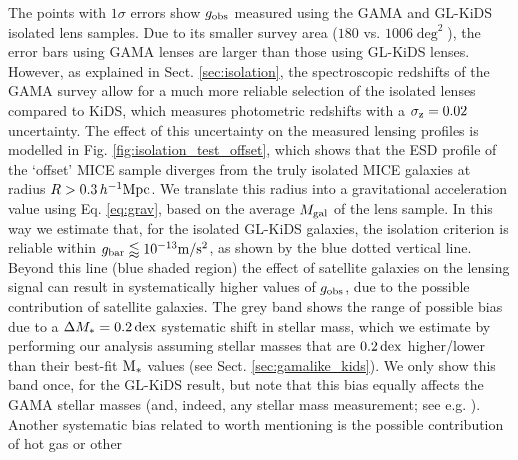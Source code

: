 \documentclass[usenatbib]{mnras}
\newcommand{\hMpc}{\, h^{-1}{\rm{Mpc}} }
\newcommand{\mpss}{ {\rm m/s^2} }
\newcommand{\un}[1]{_{\rm #1}}
\newcommand{\dex}{\, {\rm dex}}
\begin{document}
The points with $1\sigma$ errors show $g\un{obs}$ measured using the GAMA and GL-KiDS isolated lens samples. Due to its smaller survey area ($180$ vs. $1006 \deg^2$), the error bars using GAMA lenses are larger than those using GL-KiDS lenses. However, as explained in Sect. \ref{sec:isolation}, the spectroscopic redshifts of the GAMA survey allow for a much more reliable selection of the isolated lenses compared to KiDS, which measures photometric redshifts with a $\sigma\un{z}=0.02$ uncertainty. The effect of this uncertainty on the measured lensing profiles is modelled in Fig. \ref{fig:isolation_test_offset}, which shows that the ESD profile of the `offset' MICE sample diverges from the truly isolated MICE galaxies at radius $R > 0.3 \hMpc$. We translate this radius into a gravitational acceleration value using Eq. \ref{eq:grav}, based on the average $M\un{gal}$ of the lens sample. In this way we estimate that, for the isolated GL-KiDS galaxies, the isolation criterion is reliable within $g\un{bar} \lessapprox 10^{-13} \mpss$, as shown by the blue dotted vertical line. Beyond this line (blue shaded region) the effect of satellite galaxies on the lensing signal can result in systematically higher values of $g\un{obs}$, due to the possible contribution of satellite galaxies. The grey band shows the range of possible bias due to a $\Delta M_*=0.2 \dex$ systematic shift in stellar mass, which we estimate by performing our analysis assuming stellar masses that are $0.2 \dex$ higher/lower than their best-fit ${\rm M_*}$ values (see Sect. \ref{sec:gamalike_kids}). We only show this band once, for the GL-KiDS result, but note that this bias equally affects the GAMA stellar masses (and, indeed, any stellar mass measurement; see e.g. \citealt{wright2017}). Another systematic bias related to worth mentioning is the possible contribution of hot gas or other 
\end{document}
